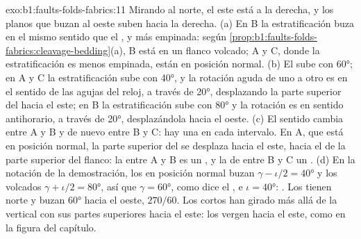 \begin{solution}{exo:b1:faults-folds-fabrics:11}
Mirando al norte, el este está a la derecha, y los planos que buzan al oeste suben hacia la derecha. (a) En B la estratificación
buza en el mismo sentido que el , y más empinada: según \cref{prop:b1:faults-folds-fabrics:cleavage-bedding}(a), B está en un
flanco volcado; A y C, donde la estratificación es menos empinada, están en posición normal. (b) El  sube con \ang{60}; en A y C la
estratificación sube con \ang{40}, y la rotación aguda de uno a otro es en el sentido de las agujas del reloj, a través de
\ang{20}, desplazando la parte superior del  hacia el este; en B la estratificación sube con \ang{80} y la rotación es en sentido
antihorario, a través de \ang{20}, desplazándola hacia el oeste. (c) El sentido cambia entre A y B y de nuevo entre B y C: hay una
 en cada intervalo. En A, que está en posición normal, la parte superior del  se desplaza hacia el este, hacia el
 de la parte superior del flanco: la  entre A y B es un , y la de entre B y C un .
(d) En la notación de la demostración, los  en posición normal buzan
$\gamma - \iota/2 = \ang{40}$ y los  volcados $\gamma + \iota/2 =
\ang{80}$, así que $\gamma = \ang{60}$, como dice el , e $\iota =
\ang{40}$: . Los  tienen  norte y buzan \ang{60} hacia el
oeste,  $270/60$. Los  cortos han girado más allá de la vertical con sus partes superiores
hacia el este: los  vergen hacia el este, como en la figura del capítulo.
\end{solution}

